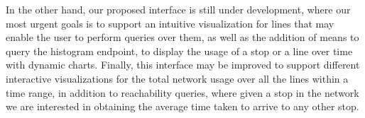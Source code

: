 \documentclass[a4paper,10pt,twoside]{book}
\begin{document}
	In the other hand, our proposed interface is still under development, where our most urgent goals is to support an intuitive visualization for lines that may enable the user to perform queries over them, as well as the addition of means to query the histogram endpoint, to display the usage of a stop or a line over time with dynamic charts. Finally, this interface may be improved to support different interactive visualizations for the total network usage over all the lines within a time range, in addition to reachability queries, where given a stop in the network we are interested in obtaining the average time taken to arrive to any other stop.
	


	
% 



\vfill \pagebreak \thispagestyle{empty} \mbox{}
\vfill \pagebreak \mbox{} \thispagestyle{empty}
\end{document}
